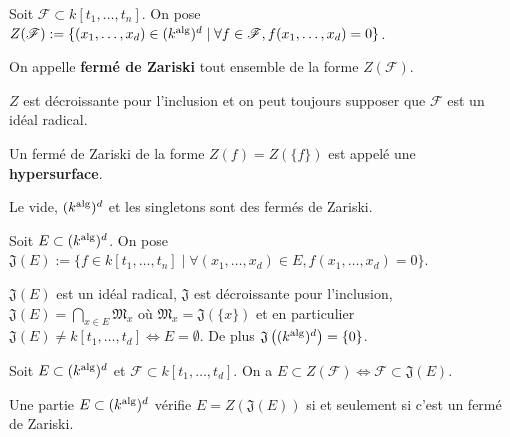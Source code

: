 	\begin{note}
		Soit $\mathscr{F} \subset k[t_1,\ldots,t_n]$.
		On pose $Z(\mathscr{F}) := \{ (x_1,\ldots,x_d) \in (k^{\operatorname{alg}})^d \mid \forall f \in \mathscr{F}, f(x_1,\ldots,x_d) = 0 \}$.
	\end{note}
	
	\begin{defn}
		On appelle \textbf{fermé de Zariski} tout ensemble de la forme $Z(\mathscr{F})$.
	\end{defn}
	
	\begin{rem}
		$Z$ est décroissante pour l'inclusion et on peut toujours supposer que $\mathscr{F}$ est un idéal radical.
	\end{rem}

	\begin{defn}
		Un fermé de Zariski de la forme $Z(f) = Z(\{ f \})$ est appelé une \textbf{hypersurface}.
	\end{defn}

	\begin{rem}
		Le vide, $(k^{\operatorname{alg}})^d$ et les singletons sont des fermés de Zariski.
	\end{rem}

	\begin{note}
		Soit $E \subset (k^{\operatorname{alg}})^d$.
		On pose $\mathfrak{J}(E) := \{ f \in k[t_1,\ldots,t_n] \mid \forall (x_1,\ldots,x_d) \in E, f(x_1,\ldots,x_d) = 0 \}$.
	\end{note}

	\begin{rem}
		$\mathfrak{J}(E)$ est un idéal radical, $\mathfrak{J}$ est décroissante pour l'inclusion, $\mathfrak{J}(E) = \bigcap_{x \in E} \mathfrak{M}_x$ où $\mathfrak{M}_x = \mathfrak{J}(\{ x \})$ et en particulier $\mathfrak{J}(E) \neq k[t_1,\ldots,t_d] \iff E = \emptyset$.
		De plus $\mathfrak{J} \left( (k^{\operatorname{alg}})^d \right) = \{ 0 \}$.
	\end{rem}

	\begin{pop}
		Soit $E \subset (k^{\operatorname{alg}})^d$ et $\mathscr{F} \subset k[t_1,\ldots,t_d]$.
		On a $E \subset Z(\mathscr{F}) \iff \mathscr{F} \subset \mathfrak{J}(E)$.
	\end{pop}
	
	\begin{pop}
		Une partie $E \subset (k^{\operatorname{alg}})^d$ vérifie $E = Z(\mathfrak{J}(E))$ si et seulement si c'est un fermé de Zariski.
	\end{pop}
	
